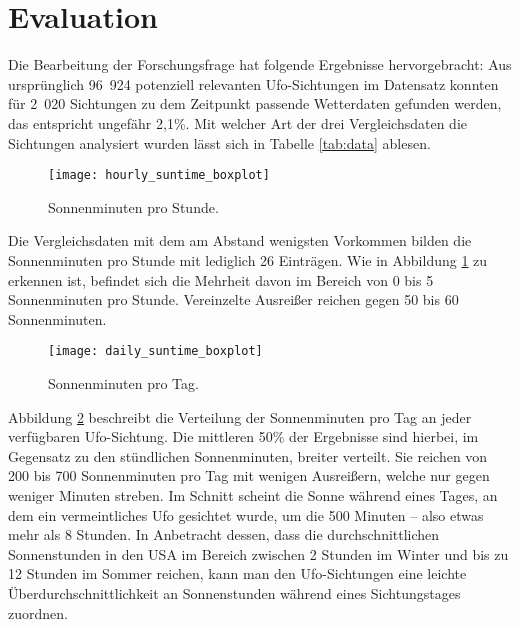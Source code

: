 \section{Evaluation} \label{evaluation}

Die Bearbeitung der Forschungsfrage hat folgende Ergebnisse hervorgebracht: Aus ursprünglich 96~924 potenziell relevanten Ufo-Sichtungen im Datensatz konnten für 2~020 Sichtungen zu dem Zeitpunkt passende Wetterdaten gefunden werden, das entspricht ungefähr 2,1\%. Mit welcher Art der drei Vergleichsdaten die Sichtungen analysiert wurden lässt sich in Tabelle \ref{tab:data} ablesen.

\begin{figure}[t]
    \centering
    \texttt{[image: hourly\_suntime\_boxplot]}
    \caption{Sonnenminuten pro Stunde.}
    \label{fig:hourly_suntime}
\end{figure}

Die Vergleichsdaten mit dem am Abstand wenigsten Vorkommen bilden die Sonnenminuten pro Stunde mit lediglich 26 Einträgen. Wie in Abbildung \ref{fig:hourly_suntime} zu erkennen ist, befindet sich die Mehrheit davon im Bereich von 0 bis 5 Sonnenminuten pro Stunde. Vereinzelte Ausreißer reichen gegen 50 bis 60 Sonnenminuten. 

\begin{figure}[t]
    \centering
    \texttt{[image: daily\_suntime\_boxplot]}
    \caption{Sonnenminuten pro Tag.}
    \label{fig:daily_suntime}
\end{figure}

Abbildung \ref{fig:daily_suntime} beschreibt die Verteilung der Sonnenminuten pro Tag an jeder verfügbaren Ufo-Sichtung. Die mittleren 50\% der Ergebnisse sind hierbei, im Gegensatz zu den stündlichen Sonnenminuten, breiter verteilt. Sie reichen von 200 bis 700 Sonnenminuten pro Tag mit wenigen Ausreißern, welche nur gegen weniger Minuten streben. Im Schnitt scheint die Sonne während eines Tages, an dem ein vermeintliches Ufo gesichtet wurde, um die 500 Minuten -- also etwas mehr als 8 Stunden. In Anbetracht dessen, dass die durchschnittlichen Sonnenstunden in den USA im Bereich zwischen 2 Stunden im Winter und bis zu 12 Stunden im Sommer reichen, kann man den Ufo-Sichtungen eine leichte Überdurchschnittlichkeit an Sonnenstunden während eines Sichtungstages zuordnen\cite{statista:2021}.

